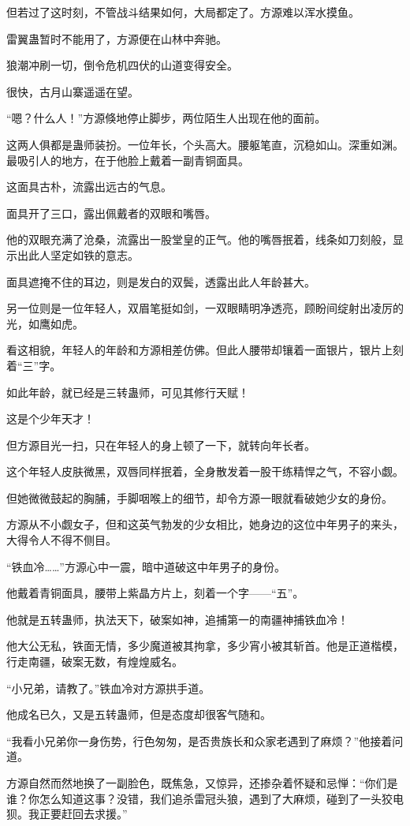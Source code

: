 \begin{this_body}
但若过了这时刻，不管战斗结果如何，大局都定了。方源难以浑水摸鱼。

雷翼蛊暂时不能用了，方源便在山林中奔驰。

狼潮冲刷一切，倒令危机四伏的山道变得安全。

很快，古月山寨遥遥在望。

“嗯？什么人！”方源倏地停止脚步，两位陌生人出现在他的面前。

这两人俱都是蛊师装扮。一位年长，个头高大。腰躯笔直，沉稳如山。深重如渊。最吸引人的地方，在于他脸上戴着一副青铜面具。

这面具古朴，流露出远古的气息。

面具开了三口，露出佩戴者的双眼和嘴唇。

他的双眼充满了沧桑，流露出一股堂皇的正气。他的嘴唇抿着，线条如刀刻般，显示出此人坚定如铁的意志。

面具遮掩不住的耳边，则是发白的双鬓，透露出此人年龄甚大。

另一位则是一位年轻人，双眉笔挺如剑，一双眼睛明净透亮，顾盼间绽射出凌厉的光，如鹰如虎。

看这相貌，年轻人的年龄和方源相差仿佛。但此人腰带却镶着一面银片，银片上刻着“三”字。

如此年龄，就已经是三转蛊师，可见其修行天赋！

这是个少年天才！

但方源目光一扫，只在年轻人的身上顿了一下，就转向年长者。

这个年轻人皮肤微黑，双唇同样抿着，全身散发着一股干练精悍之气，不容小觑。

但她微微鼓起的胸脯，手脚咽喉上的细节，却令方源一眼就看破她少女的身份。

方源从不小觑女子，但和这英气勃发的少女相比，她身边的这位中年男子的来头，大得令人不得不侧目。

“铁血冷……”方源心中一震，暗中道破这中年男子的身份。

他戴着青铜面具，腰带上紫晶方片上，刻着一个字——“五”。

他就是五转蛊师，执法天下，破案如神，追捕第一的南疆神捕铁血冷！

他大公无私，铁面无情，多少魔道被其拘拿，多少宵小被其斩首。他是正道楷模，行走南疆，破案无数，有煌煌威名。

“小兄弟，请教了。”铁血冷对方源拱手道。

他成名已久，又是五转蛊师，但是态度却很客气随和。

“我看小兄弟你一身伤势，行色匆匆，是否贵族长和众家老遇到了麻烦？”他接着问道。

方源自然而然地换了一副脸色，既焦急，又惊异，还掺杂着怀疑和忌惮：“你们是谁？你怎么知道这事？没错，我们追杀雷冠头狼，遇到了大麻烦，碰到了一头狡电狈。我正要赶回去求援。”


\end{this_body}
